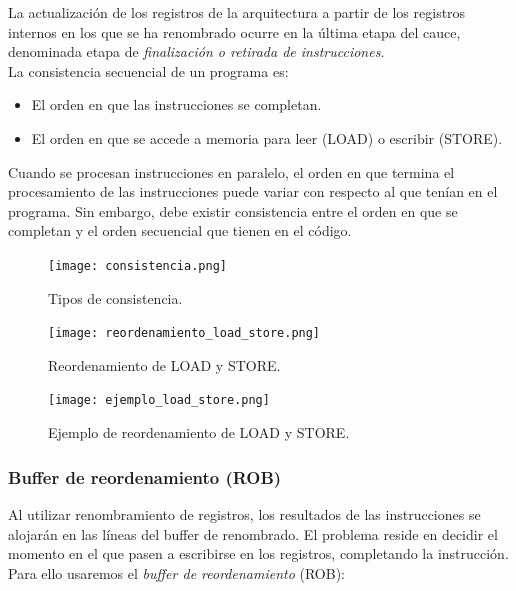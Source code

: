 \documentclass[12pt,spanish]{article}
\begin{document}
La actualización de los registros de la arquitectura a partir de los registros internos en los que se ha renombrado ocurre en la última etapa del cauce, denominada etapa de \emph{finalización o retirada de instrucciones}.\\

La consistencia secuencial de un programa es:
\begin{itemize}
	\item El orden en que las instrucciones se completan.
	\item El orden en que se accede a memoria para leer (LOAD) o escribir (STORE).
\end{itemize}

Cuando se procesan instrucciones en paralelo, el orden en que termina el procesamiento de las instrucciones puede variar con respecto al que tenían en el programa. Sin embargo, debe existir consistencia entre el orden en que se completan y el orden secuencial que tienen en el código.

\begin{figure}[H]
\centering
\texttt{[image: consistencia.png]}
\caption{Tipos de consistencia.}
\end{figure}

\begin{figure}[H]
\centering
\texttt{[image: reordenamiento\_load\_store.png]}
\caption{Reordenamiento de LOAD y STORE.}
\end{figure}

\begin{figure}[H]
\centering
\texttt{[image: ejemplo\_load\_store.png]}
\caption{Ejemplo de reordenamiento de LOAD y STORE.}
\end{figure}
	
	
	
	
\subsubsection{Buffer de reordenamiento (ROB)}

Al utilizar renombramiento de registros, los resultados de las instrucciones se alojarán en las líneas del buffer de renombrado. El problema reside en decidir el momento en el que pasen a escribirse en los registros, completando la instrucción. Para ello usaremos el \emph{buffer de reordenamiento} (ROB):
\end{document}
